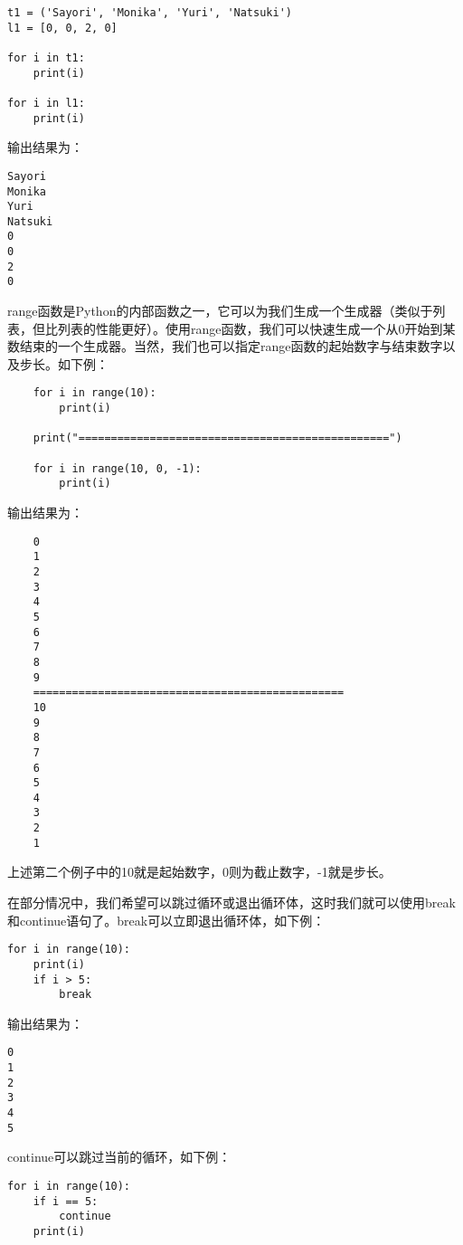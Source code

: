 \begin{lstlisting}
t1 = ('Sayori', 'Monika', 'Yuri', 'Natsuki')
l1 = [0, 0, 2, 0]

for i in t1:
    print(i)

for i in l1:
    print(i)
\end{lstlisting}

输出结果为：
\begin{lstlisting}
Sayori
Monika
Yuri
Natsuki
0
0
2
0
\end{lstlisting}

\begin{ExtraKnowledge}
    range函数是Python的内部函数之一，它可以为我们生成一个生成器（类似于列表，但比列表的性能更好）。使用range函数，我们可以快速生成一个从0开始到某数结束的一个生成器。当然，我们也可以指定range函数的起始数字与结束数字以及步长。如下例：
    \begin{lstlisting}
    for i in range(10):
        print(i)

    print("================================================")

    for i in range(10, 0, -1):
        print(i)
    \end{lstlisting}
    输出结果为：
    \begin{lstlisting}
    0
    1
    2
    3
    4
    5
    6
    7
    8
    9
    ================================================
    10
    9
    8
    7
    6
    5
    4
    3
    2
    1
    \end{lstlisting}

    上述第二个例子中的10就是起始数字，0则为截止数字，-1就是步长。
\end{ExtraKnowledge}

在部分情况中，我们希望可以跳过循环或退出循环体，这时我们就可以使用break和continue语句了。break可以立即退出循环体，如下例：

\begin{lstlisting}
for i in range(10):
    print(i)
    if i > 5:
        break
\end{lstlisting}

输出结果为：
\begin{lstlisting}
0
1
2
3
4
5
\end{lstlisting}

continue可以跳过当前的循环，如下例：

\begin{lstlisting}
for i in range(10):
    if i == 5:
        continue
    print(i)
\end{lstlisting}


